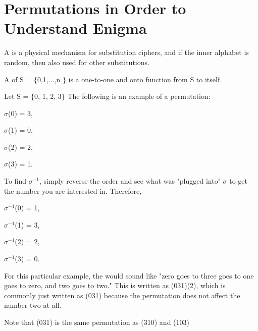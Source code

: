 \section{Permutations in Order to Understand Enigma}
\begin{definition}A  is a physical mechanism for substitution ciphers, and if the inner alphabet is random, then also used for other substitutions. \end{definition}
\begin{definition} A  of S = $\{$0,1,...,n $\}$ is a one-to-one and onto function from S to itself. \end{definition}

\begin{example}
Let S = $\{$0, 1, 2, 3$\}$ The following is an example of a permutation: \par $\sigma$(0) = 3, \par $\sigma$(1) = 0, \par $\sigma$(2) = 2, \par $\sigma$(3) = 1. \par \medspace To find $\sigma^{-1}$, simply reverse the order and see what was "plugged into" $\sigma$ to get the number you are interested in. Therefore, \par $\sigma^{-1}$(0) = 1, \par $\sigma^{-1}$(1) = 3, \par $\sigma^{-1}$(2) = 2, \par $\sigma^{-1}$(3) = 0. \par For this particular example, the  would sound like "zero goes to three goes to one goes to zero, and two goes to two." This is written as (031)(2), which is commonly just written as (031) because the permutation does not affect the number two at all. \par Note that (031) is the same permutation as (310) and (103) \end{example} \par

